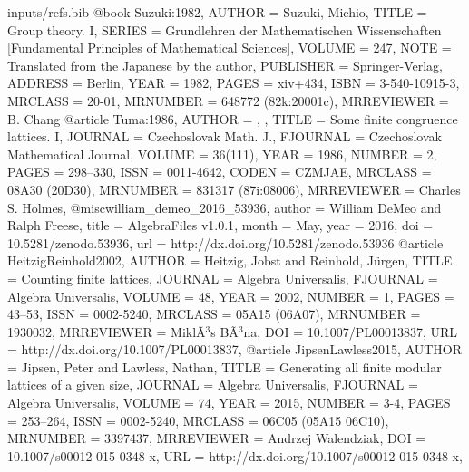\begin{filecontents*}{inputs/refs.bib}
  @book {Suzuki:1982,
    AUTHOR = {Suzuki, Michio},
    TITLE = {Group theory. {I}},
    SERIES = {{G}rundlehren der {M}athematischen {W}issenschaften [{F}undamental
        {P}rinciples of {M}athematical {S}ciences]},
    VOLUME = {247},
    NOTE = {Translated from the Japanese by the author},
    PUBLISHER = {Springer-Verlag},
    ADDRESS = {Berlin},
    YEAR = {1982},
    PAGES = {xiv+434},
    ISBN = {3-540-10915-3},
    MRCLASS = {20-01},
    MRNUMBER = {648772 (82k:20001c)},
    MRREVIEWER = {B. Chang}
  }
  @article {Tuma:1986,
    AUTHOR = {\Tuma, \Jiri},
    TITLE = {Some finite congruence lattices. {I}},
    JOURNAL = {Czechoslovak Math. J.},
    FJOURNAL = {Czechoslovak Mathematical Journal},
    VOLUME = {36(111)},
    YEAR = {1986},
    NUMBER = {2},
    PAGES = {298--330},
    ISSN = {0011-4642},
    CODEN = {CZMJAE},
    MRCLASS = {08A30 (20D30)},
    MRNUMBER = {831317 (87i:08006)},
    MRREVIEWER = {Charles S. Holmes},
  }
@misc{william_demeo_2016_53936,
  author       = {William DeMeo and
                  Ralph Freese},
  title        = {AlgebraFiles v1.0.1},
  month        = May,
  year         = 2016,
  doi          = {10.5281/zenodo.53936},
  url          = {http://dx.doi.org/10.5281/zenodo.53936}
}
@article {HeitzigReinhold2002,
    AUTHOR = {Heitzig, Jobst and Reinhold, J\"urgen},
     TITLE = {Counting finite lattices},
   JOURNAL = {Algebra Universalis},
  FJOURNAL = {Algebra Universalis},
    VOLUME = {48},
      YEAR = {2002},
    NUMBER = {1},
     PAGES = {43--53},
      ISSN = {0002-5240},
   MRCLASS = {05A15 (06A07)},
  MRNUMBER = {1930032},
MRREVIEWER = {Mikl\~A${}^3$s B\~A${}^3$na},
       DOI = {10.1007/PL00013837},
       URL = {http://dx.doi.org/10.1007/PL00013837},
}
@article {JipsenLawless2015,
    AUTHOR = {Jipsen, Peter and Lawless, Nathan},
     TITLE = {Generating all finite modular lattices of a given size},
   JOURNAL = {Algebra Universalis},
  FJOURNAL = {Algebra Universalis},
    VOLUME = {74},
      YEAR = {2015},
    NUMBER = {3-4},
     PAGES = {253--264},
      ISSN = {0002-5240},
   MRCLASS = {06C05 (05A15 06C10)},
  MRNUMBER = {3397437},
MRREVIEWER = {Andrzej Walendziak},
       DOI = {10.1007/s00012-015-0348-x},
       URL = {http://dx.doi.org/10.1007/s00012-015-0348-x},
}
\end{filecontents*}



\documentclass{au}

